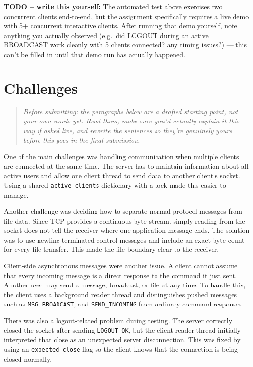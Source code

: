 \documentclass[11pt]{article}
\newcommand{\cmd}[1]{\texttt{#1}}
\newenvironment{todobox}
  {\begin{shaded}\textbf{TODO -- write this yourself:} }
  {\end{shaded}}
\newenvironment{reviewnote}
  {\begin{quote}\itshape\small}
  {\end{quote}\normalfont\normalsize}
\begin{document}
\begin{todobox}
The automated test above exercises two concurrent clients end-to-end,
but the assignment specifically requires a live demo with 5+ concurrent
interactive clients. After running that demo yourself, note anything
you actually observed (e.g.\ did LOGOUT during an active BROADCAST work
cleanly with 5 clients connected? any timing issues?) --- this can't be
filled in until that demo run has actually happened.
\end{todobox}

\section{Challenges}

\begin{reviewnote}
Before submitting: the paragraphs below are a drafted starting point,
not your own words yet. Read them, make sure you'd actually explain it
this way if asked live, and rewrite the sentences so they're genuinely
yours before this goes in the final submission.
\end{reviewnote}

One of the main challenges was handling communication when multiple
clients are connected at the same time. The server has to maintain
information about all active users and allow one client thread to send
data to another client's socket. Using a shared \cmd{active\_clients}
dictionary with a lock made this easier to manage.

Another challenge was deciding how to separate normal protocol messages
from file data. Since TCP provides a continuous byte stream, simply
reading from the socket does not tell the receiver where one
application message ends. The solution was to use newline-terminated
control messages and include an exact byte count for every file
transfer. This made the file boundary clear to the receiver.

Client-side asynchronous messages were another issue. A client cannot
assume that every incoming message is a direct response to the command
it just sent. Another user may send a message, broadcast, or file at
any time. To handle this, the client uses a background reader thread
and distinguishes pushed messages such as \cmd{MSG}, \cmd{BROADCAST},
and \cmd{SEND\_INCOMING} from ordinary command responses.

There was also a logout-related problem during testing. The server
correctly closed the socket after sending \cmd{LOGOUT\_OK}, but the
client reader thread initially interpreted that close as an unexpected
server disconnection. This was fixed by using an \cmd{expected\_close}
flag so the client knows that the connection is being closed normally.
\end{document}
